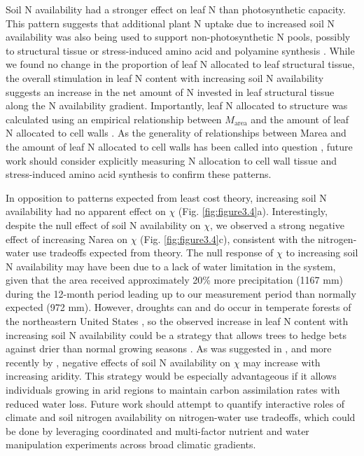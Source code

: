     Soil N availability had a stronger effect on leaf N than photosynthetic capacity. This pattern suggests that additional plant N uptake due to increased soil N availability was also being used to support non-photosynthetic N pools, possibly to structural tissue or stress-induced amino acid and polyamine synthesis . While we found no change in the proportion of leaf N allocated to leaf structural tissue, the overall stimulation in leaf N content with increasing soil N availability suggests an increase in the net amount of N invested in leaf structural tissue along the N availability gradient. Importantly, leaf N allocated to structure was calculated using an empirical relationship between $M_\mathrm{area}$ and the amount of leaf N allocated to cell walls . As the generality of relationships between Marea and the amount of leaf N allocated to cell walls has been called into question , future work should consider explicitly measuring N allocation to cell wall tissue and stress-induced amino acid synthesis to confirm these patterns.
    
    In opposition to patterns expected from least cost theory, increasing soil N availability had no apparent effect on $\chi$ (Fig. \ref{fig:figure3.4}a). Interestingly, despite the null effect of soil N availability on $\chi$, we observed a strong negative effect of increasing Narea on $\chi$ (Fig. \ref{fig:figure3.4}c), consistent with the nitrogen-water use tradeoffs expected from theory. The null response of $\chi$ to increasing soil N availability may have been due to a lack of water limitation in the system, given that the area received approximately 20\% more precipitation (1167 mm) during the 12-month period leading up to our measurement period than normally expected (972 mm). However, droughts can and do occur in temperate forests of the northeastern United States , so the observed increase in leaf N content with increasing soil N availability could be a strategy that allows trees to hedge bets against drier than normal growing seasons . As was suggested in , and more recently by , negative effects of soil N availability on $\chi$ may increase with increasing aridity. This strategy would be especially advantageous if it allows individuals growing in arid regions to maintain carbon assimilation rates with reduced water loss. Future work should attempt to quantify interactive roles of climate and soil nitrogen availability on nitrogen-water use tradeoffs, which could be done by leveraging coordinated and multi-factor nutrient  and water  manipulation experiments across broad climatic gradients.
    
